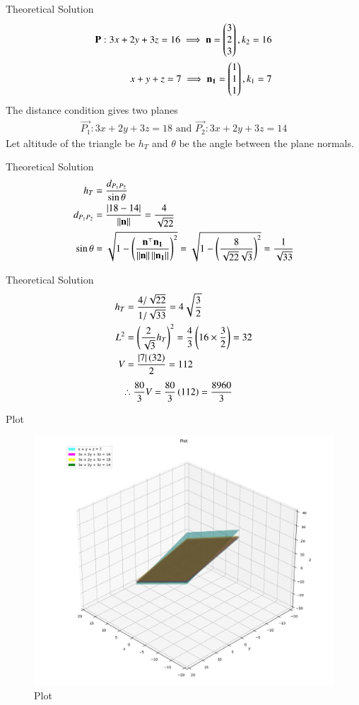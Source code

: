 \documentclass{beamer}
\begin{document}
\begin{frame}{Theoretical Solution}
\begin{align}
    \mathbf{P}: 3x+2y+3z=16 \implies \mathbf{n} = \begin{pmatrix}3 \\ 2 \\ 3\end{pmatrix}, k_2=16 \\
    x+y+z=7 \implies \mathbf{n_1} = \begin{pmatrix}1 \\ 1 \\ 1\end{pmatrix}, k_1=7 \\
\end{align}
The distance condition gives two planes
\begin{align}
	\vec{P_1}: 3x+2y+3z=18\text{ and }\vec{P_2}: 3x+2y+3z=14
\end{align}
Let altitude of the triangle be $h_T$ and $\theta$ be the angle between the plane normals.
\end{frame}

\begin{frame}{Theoretical Solution}
\begin{align}
    h_T &= \frac{d_{P_1P_2}}{\sin\theta} \\
    d_{P_1P_2} &= \frac{\left\vert18-14\right\vert}{\left\lVert\mathbf{n}\right\rVert} = \frac{4}{\sqrt{22}} \\
    \sin\theta &= \sqrt{1 - \left(\frac{\mathbf{n}^\top\mathbf{n_1}}{\left\lVert\mathbf{n}\right\rVert\left\lVert\mathbf{n_1}\right\rVert}\right)^2} = \sqrt{1 - \left(\frac{8}{\sqrt{22}\sqrt{3}}\right)^2} = \frac{1}{\sqrt{33}}
\end{align}
\end{frame}

\begin{frame}{Theoretical Solution}
\begin{align}
    h_T &= \frac{4/\sqrt{22}}{1/\sqrt{33}} = 4\sqrt{\frac{3}{2}} \\
    L^2 &= \left(\frac{2}{\sqrt{3}}h_T\right)^2 = \frac{4}{3}\left(16 \times \frac{3}{2}\right) = 32 \\
    V &= \frac{\left\vert7\right\vert\left(32\right)}{2} = 112
\end{align}
\begin{align}
    \therefore \frac{80}{3}V &= \frac{80}{3}\left(112\right) = \frac{8960}{3}
\end{align}
\end{frame}

\begin{frame}{Plot}
\begin{figure}
	\centering
	\includegraphics[width=0.5\columnwidth]{../figs/plot_p.jpg}
	\caption{Plot}
	\label{fig:fig}
\end{figure}
\end{frame}
\end{document}
